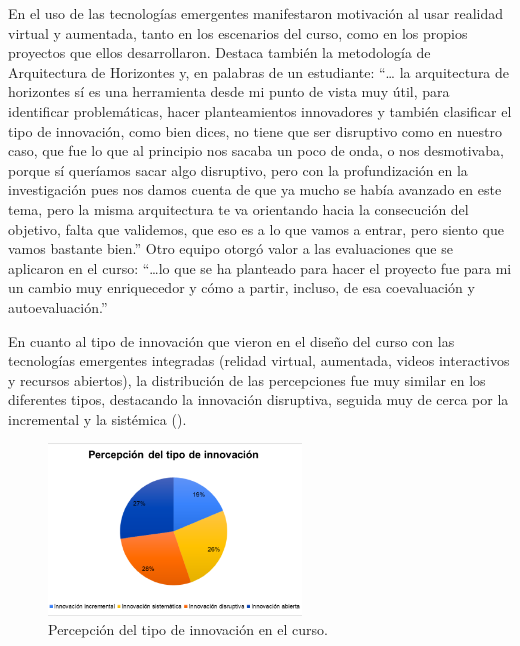 \documentclass[spanish]{textolivre}
\begin{document}
En el uso de las tecnologías emergentes manifestaron motivación al usar realidad virtual y aumentada, tanto en los escenarios del curso, como en los propios proyectos que ellos desarrollaron. Destaca también la metodología de Arquitectura de Horizontes y, en palabras de un estudiante: “… la arquitectura de horizontes sí es una herramienta desde mi punto de vista muy útil, para identificar problemáticas, hacer planteamientos innovadores y también clasificar el tipo de innovación, como bien dices, no tiene que ser disruptivo como en nuestro caso, que fue lo que al principio nos sacaba un poco de onda, o nos desmotivaba, porque sí queríamos sacar algo disruptivo, pero con la profundización en la investigación pues nos damos cuenta de que ya mucho se había avanzado en este tema, pero la misma arquitectura te va orientando hacia la consecución del objetivo, falta que validemos, que eso es a lo que vamos a entrar, pero siento que vamos bastante bien.” Otro equipo otorgó valor a las evaluaciones que se aplicaron en el curso: “…lo que se ha planteado para hacer el proyecto fue para mi un cambio muy enriquecedor y cómo a partir, incluso, de esa coevaluación y autoevaluación.”

En cuanto al tipo de innovación que vieron en el diseño del curso con las tecnologías emergentes integradas (relidad virtual, aumentada, videos interactivos y recursos abiertos), la distribución de las percepciones fue muy similar en los diferentes tipos, destacando la innovación disruptiva, seguida muy de cerca por la incremental y la sistémica ().

\begin{figure}[htbp]
 \centering
 \includegraphics[width=0.6\textwidth]{fig3-25716.png}
 \caption{Percepción del tipo de innovación en el curso.}
 \label{fig3}
\end{figure}
\end{document}
